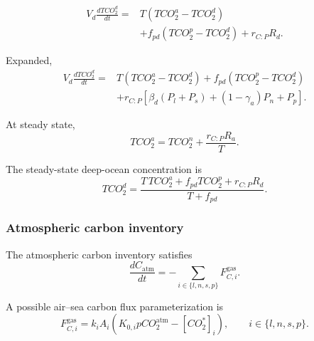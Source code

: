 \documentclass[11pt]{article}
\begin{document}
\begin{equation}
\begin{split}
V_d\frac{dTCO_2^d}{dt}
={}&
T
\left(
TCO_2^a-TCO_2^d
\right)
\\
&+
f_{pd}
\left(
TCO_2^p-TCO_2^d
\right)
+
r_{C:P}R_d.
\end{split}
\label{eq:seven_tco2_d}
\end{equation}

Expanded,
\begin{equation}
\begin{split}
V_d\frac{dTCO_2^d}{dt}
={}&
T
\left(
TCO_2^a-TCO_2^d
\right)
+
f_{pd}
\left(
TCO_2^p-TCO_2^d
\right)
\\
&+
r_{C:P}
\left[
\beta_d
\left(
P_l+P_s
\right)
+
\left(1-\gamma_a\right)P_n
+
P_p
\right].
\end{split}
\label{eq:seven_tco2_d_expanded}
\end{equation}

At steady state,
\begin{equation}
TCO_2^a
=
TCO_2^n
+
\frac{r_{C:P}R_a}{T}.
\label{eq:seven_tco2_a_steady}
\end{equation}

The steady-state deep-ocean concentration is
\begin{equation}
TCO_2^d
=
\frac{
T\,TCO_2^a
+
f_{pd}TCO_2^p
+
r_{C:P}R_d
}{
T+f_{pd}
}.
\label{eq:seven_tco2_d_steady}
\end{equation}

\subsubsection{Atmospheric carbon inventory}

The atmospheric carbon inventory satisfies
\begin{equation}
\frac{dC_{\mathrm{atm}}}{dt}
=
-
\sum_{i\in\{l,n,s,p\}}
F^{\mathrm{gas}}_{C,i}.
\label{eq:seven_carbon_atmosphere}
\end{equation}

A possible air--sea carbon flux parameterization is
\begin{equation}
F^{\mathrm{gas}}_{C,i}
=
k_iA_i
\left(
K_{0,i}pCO_2^{\mathrm{atm}}
-
[CO_2^\ast]_i
\right),
\qquad
i\in\{l,n,s,p\}.
\label{eq:seven_co2_gas_flux}
\end{equation}

\end{document}
